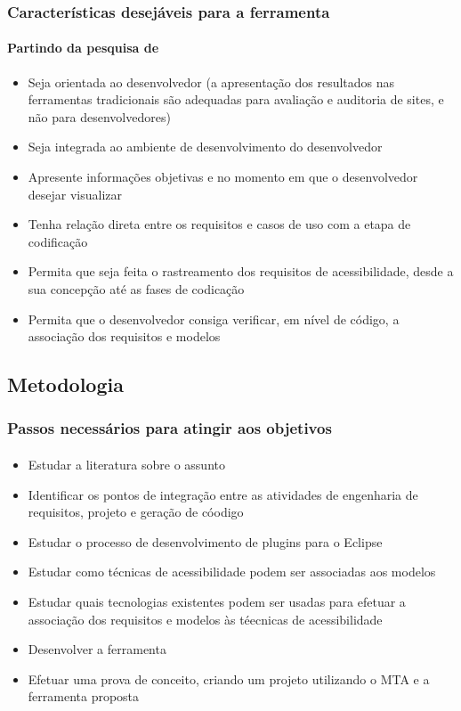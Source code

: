 \documentclass{beamer}
\begin{document}
\begin{frame}[allowframebreaks]
\frametitle{Características desejáveis para a ferramenta}
\framesubtitle{Partindo da pesquisa de \citet{Trewin:2010:ACT:1805986.1806029}}

\begin{itemize}
 \item Seja orientada ao desenvolvedor (a apresentação dos resultados nas ferramentas tradicionais são adequadas para avaliação e auditoria de sites, e não para desenvolvedores)
 \item Seja integrada ao ambiente de desenvolvimento do desenvolvedor
 \item Apresente informações objetivas e no momento em que o desenvolvedor desejar visualizar
 \item Tenha relação direta entre os requisitos e casos de uso com a etapa de codificação
 \item Permita que seja feita o rastreamento dos requisitos de acessibilidade, desde a sua concepção até as fases de codicação
 \item Permita que o desenvolvedor consiga verificar, em nível de código, a associação dos requisitos e modelos
\end{itemize}

\end{frame}

\subsection[Metodologia]{Metodologia}

\begin{frame}[allowframebreaks]
\frametitle{Passos necessários para atingir aos objetivos}
\framesubtitle{}

\begin{itemize}
 \item Estudar a literatura sobre o assunto
 \item Identificar os pontos de integração entre as atividades de engenharia de requisitos, projeto e geração de cóodigo
 \item Estudar o processo de desenvolvimento de plugins para o Eclipse
 \item Estudar como técnicas de acessibilidade podem ser associadas aos modelos
 \item Estudar quais tecnologias existentes podem ser usadas para efetuar a associação dos requisitos e modelos às téecnicas de acessibilidade
 \item Desenvolver a ferramenta
 \item Efetuar uma prova de conceito, criando um projeto utilizando o MTA e a ferramenta proposta
\end{itemize}

\end{frame}
\end{document}
